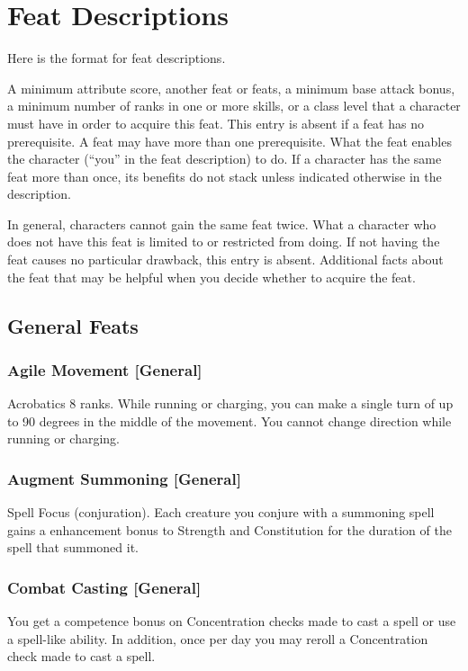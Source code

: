 \section{Feat Descriptions}
Here is the format for feat descriptions.

 A minimum attribute score, another feat or feats, a minimum base attack bonus, a minimum number of ranks in one or more skills, or a class level that a character must have in order to acquire this feat. This entry is absent if a feat has no prerequisite. A feat may have more than one prerequisite.
 What the feat enables the character (``you'' in the feat description) to do. If a character has the same feat more than once, its benefits do not stack unless indicated otherwise in the description.
\par In general, characters cannot gain the same feat twice.
 What a character who does not have this feat is limited to or restricted from doing. If not having the feat causes no particular drawback, this entry is absent.
 Additional facts about the feat that may be helpful when you decide whether to acquire the feat.

\subsection{General Feats}

\subsubsection{Agile Movement [General]}
 Acrobatics 8 ranks.
 While running or charging, you can make a single turn of up to 90 degrees in the middle of the movement.
 You cannot change direction while running or charging.

\subsubsection{Augment Summoning [General]}
 Spell Focus (conjuration).
 Each creature you conjure with a summoning spell gains a  enhancement bonus to Strength and Constitution for the duration of the spell that summoned it.

\subsubsection{Combat Casting [General]}
 You get a  competence bonus on Concentration checks made to cast a spell or use a spell-like ability. In addition, once per day you may reroll a Concentration check made to cast a spell.

